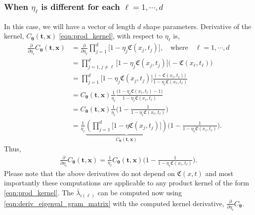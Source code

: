 \documentclass{svjour3}                     %
\newcommand{\bm}[1]{\boldsymbol{#1}}
\newcommand{\vtheta}{{\bm{\theta}}}
\newcommand{\vt}{\bm{t}}
\newcommand{\vx}{\bm{x}}
\begin{document}
\subsubsection{When $\eta_\ell$ is different for each $\ell = 1,\cdots,d$}
In this case, we will have a vector of length $d$ shape parameters. Derivative of the kernel, $C_\vtheta(\vt, \vx)$ \eqref{eqn:prod_kernel}, with respect to $\eta_\ell$ is,
\begin{align*}
\frac{\partial}{\partial \eta_\ell} C_\vtheta(\vt, \vx) 
& =
\frac{\partial}{\partial \eta_\ell} 
\prod_{j=1}^d \biggl[
1 - \eta_j \mathfrak{C}(x_j,t_j) \biggr], \quad \text{where} \quad \ell = 1, \cdots, d
\\
& = 
\prod_{j=1, j \neq \ell}^d \biggl[
1 - \eta_j \mathfrak{C}(x_j,t_j) \biggr]
\biggl( - \mathfrak{C}(x_\ell,t_\ell) \biggr)
\\
& =
\prod_{j=1}^d \biggl[
1 - \eta_j \mathfrak{C}(x_j,t_j) \biggr]
\frac{
	\biggl( - \mathfrak{C}(x_\ell,t_\ell) \biggr)
}{
	1 - \eta_\ell \mathfrak{C}(x_\ell,t_\ell) 
}
\\
& =
C_\vtheta(\vt, \vx) 
\frac{1}{\eta_\ell}
\frac{
	\biggl(1 - \eta_\ell \mathfrak{C}(x_\ell,t_\ell)  - 1 \biggr)
}{
	1 - \eta_\ell \mathfrak{C}(x_\ell,t_\ell) 
}
\\
& =
C_\vtheta(\vt, \vx) 
\frac{1}{\eta_\ell}
\biggl(
1 - 
\frac{1
}{
	1 - \eta_\ell \mathfrak{C}(x_\ell,t_\ell) 
}
\biggr)
\\
& =
\frac{1}{\eta_\ell} 
\underbrace{
	\left(
	\prod_{j=1}^d \biggl[
	1 - \eta \mathfrak{C}(x_j,t_j) \biggr]
	\right) }_
{ C_\vtheta(\vt, \vx) }
\biggl(
1 - 
\frac{1}
{ 1 - \eta_\ell \mathfrak{C}(x_\ell, t_\ell) }
\biggr) 
.
\end{align*}
Thus, 
\begin{align*}
\frac{\partial}{\partial \eta_\ell} C_\vtheta(\vt, \vx) = \frac{1}{\eta_\ell} 
{ C_\vtheta(\vt, \vx) }
\biggl(
1 - 
\frac{1}
{ 1 - \eta_\ell \mathfrak{C}(x_\ell,t_\ell) }
\biggr).
\end{align*}
Please note that the above derivatives do not depend on $\mathfrak{C}(x,t)$ and most importantly these computations are applicable to any product kernel of the form \eqref{eqn:prod_kernel}.
The $\bar{\lambda}_{i(\ell)}$ can be computed now using \eqref{eqn:deriv_eigenval_gram_matrix} with the computed kernel derivative, $\frac{\partial}{\partial \eta_\ell} C_\vtheta$.
\end{document}
